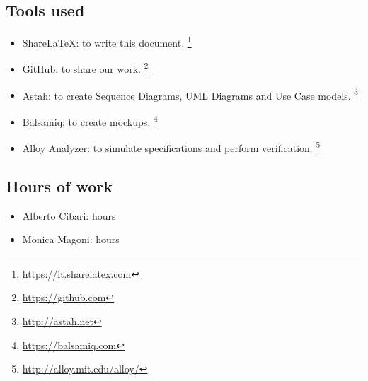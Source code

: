 \subsection{Tools used}
    \begin{itemize}
    \item ShareLaTeX: to write this document. \footnote{\url{https://it.sharelatex.com}}
    \item GitHub: to share our work. \footnote{\url{https://github.com}} 
    \item Astah: to create Sequence Diagrams, UML Diagrams and Use Case models. \footnote{\url{http://astah.net}}
    \item Balsamiq: to create mockups. \footnote{\url{https://balsamiq.com}}
    \item Alloy Analyzer: to simulate specifications and perform verification. \footnote{\url{http://alloy.mit.edu/alloy/}}
    \end{itemize}

\subsection{Hours of work}
    \begin{itemize}
    \item Alberto Cibari: hours
    \item Monica Magoni: hours
    \end{itemize}